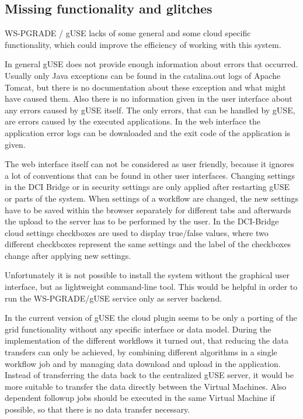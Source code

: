 \subsection{Missing functionality and glitches}\label{missing}

WS-PGRADE / gUSE lacks of some general and some cloud specific functionality, which could improve the efficiency of working with this system.

In general gUSE does not provide enough information about errors that occurred.
Usually only Java exceptions can be found in the catalina.out logs of Apache Tomcat, but there is no documentation about these exception and what might have caused them.
Also there is no information given in the user interface about any errors caused by gUSE itself.
The only errors, that can be handled by gUSE, are errors caused by the executed applications.
In the web interface the application error logs can be downloaded and the exit code of the application is given.

The web interface itself can not be considered as user friendly, because it ignores a lot of conventions that can be found in other user interfaces.
Changing settings in the DCI Bridge or in security settings are only applied after restarting gUSE or parts of the system.
When settings of a workflow are changed, the new settings have to be saved within the browser separately for different tabs and afterwards the upload to the server has to be performed by the user.
In the DCI-Bridge cloud settings checkboxes are used to display true/false values, where two different checkboxes represent the same settings and the label of the checkboxes change after applying new settings.

Unfortunately it is not possible to install the system without the graphical user interface, but as lightweight command-line tool.
This would be helpful in order to run the WS-PGRADE/gUSE service only as server backend.

In the current version of gUSE the cloud plugin seems to be only a porting of the grid functionality without any specific interface or data model.
During the implementation of the different workflows it turned out, that reducing the data transfers can only be achieved, by combining different algorithms in a single workflow job and by managing data download and upload in the application.
Instead of transferring the data back to the centralized gUSE server, it would be more suitable to transfer the data directly between the Virtual Machines.
Also dependent followup jobs should be executed in the same Virtual Machine if possible, so that there is no data transfer necessary.

